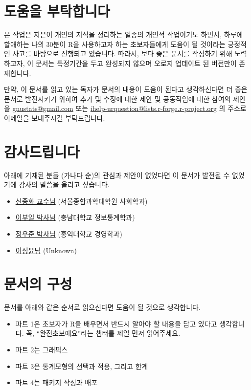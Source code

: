 \documentclass[tutorial.tex]{subfiles}
\begin{document}
\section*{도움을 부탁합니다}

본 작업은 지은이 개인의 지식을 정리하는 일종의 개인적 작업이기도 하면서, 
하루에 할애하는 나의 30분이 R을 사용하고자 하는 초보자들에게 도움이 될 것이라는 긍정적인 사고를 바탕으로 진행되고 있습니다. 
따라서, 보다 좋은 문서를 작성하기 위해 노력하고자, 이 문서는 특정기간을 두고 완성되지 않으며 오로지 업데이트 된 버전만이 존재합니다.
 
만약, 이 문서를 읽고 있는 독자가 문서의 내용이 도움이 된다고 생각하신다면 더 좋은 문서로 발전시키기 위하여 추가 및 수정에 대한 제안 및 공동작업에 대한 참여의 제안을 \href{mailto:gnustats@gmail.com}{gnustats@gmail.com} 또는 \href{mailto:ihelp-urquestion@lists.r-forge.r-project.org}{ihelp-urquestion@lists.r-forge.r-project.org} 의 주소로 이메일을 보내주시길 부탁드립니다. 

\section*{감사드립니다}

아래에 기재된 분들 (가나다 순)의 관심과 제안이 없었다면 이 문서가 발전될 수 없었기에 감사의 말씀을 올리고 싶습니다. 

\begin{itemize}
\item \href{mailto:jhshin@assist.ac.kr}{신종화 교수님} (서울종합과학대학원 사회학과)
\item \href{mailto:buillee@hanmail.net}{이부일 박사님} (충남대학교 정보통계학과)
\item \href{mailto:muoe78@gmail.com}{정우준 박사님} (홍익대학교 경영학과)
\item \href{mailto:christ00@hanmail.net}{이성윤님} (Unknown)
\end{itemize}

\section{문서의 구성}

문서를 아래와 같은 순서로 읽으신다면 도움이 될 것으로 생각합니다. 

\begin{itemize}
\item 파트 1은 초보자가 R을 배우면서 반드시 알아야 할 내용을 담고 있다고 생각합니다. 
꼭, ``완전초보에요''라는 챕터를 제일 먼저 읽어주세요.
\item 파트 2는 그래픽스 
\item 파트 3은 통계모형의 선택과 적용, 그리고 한계
\item 파트 4는 패키지 작성과 배포
\end{itemize}
\end{document}
